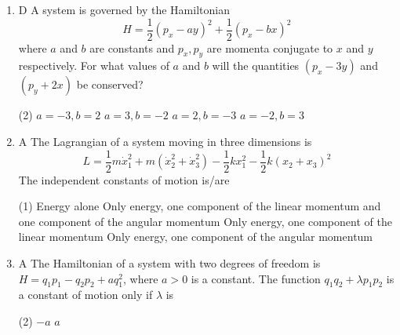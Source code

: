 \begin{enumerate}
{}
 \begin{tasks}(4)
	\task[\textbf{a.}]$\sqrt{2} p-x$
	\task[\textbf{b.}] $p-\sqrt{2} x$
	\task[\textbf{c.}]$p+\sqrt{2} x$
	\task[\textbf{d.}]  $x+\sqrt{2} p$
\end{tasks}
\item D A system is governed by the Hamiltonian
$$
H=\frac{1}{2}\left(p_{x}-a y\right)^{2}+\frac{1}{2}\left(p_{x}-b x\right)^{2}
$$
where $a$ and $b$ are constants and $p_{x}, p_{y}$ are momenta conjugate to $x$ and $y$ respectively.
For what values of $a$ and $b$ will the quantities $\left(p_{x}-3 y\right)$ and $\left(p_{y}+2 x\right)$ be conserved?
{}
 \begin{tasks}(2)
	\task[\textbf{a.}]$a=-3, b=2$
	\task[\textbf{b.}]$a=3, b=-2$
	\task[\textbf{c.}]$a=2, b=-3$
	\task[\textbf{d.}] $a=-2, b=3$
\end{tasks}
\item A The Lagrangian of a system moving in three dimensions is
$$
L=\frac{1}{2} m \dot{x}_{1}^{2}+m\left(\dot{x}_{2}^{2}+\dot{x}_{3}^{2}\right)-\frac{1}{2} k x_{1}^{2}-\frac{1}{2} k\left(x_{2}+x_{3}\right)^{2}
$$
The independent constants of motion is/are
{}
 \begin{tasks}(1)
	\task[\textbf{a.}]Energy alone
	\task[\textbf{b.}] Only energy, one component of the linear momentum and one component of the angular momentum
	\task[\textbf{c.}] Only energy, one component of the linear momentum
	\task[\textbf{d.}] Only energy, one component of the angular momentum
\end{tasks}
\item A The Hamiltonian of a system with two degrees of freedom is $H=q_{1} p_{1}-q_{2} p_{2}+a q_{1}^{2}$, where $a>0$ is a constant. The function $q_{1} q_{2}+\lambda p_{1} p_{2}$ is a constant of motion only if $\lambda$ is
{}
 \begin{tasks}(2)
	\task[\textbf{c.}]$-a$
	\task[\textbf{d.}]$a$ 
\end{tasks}
\end{enumerate}
\setlength\arrayrulewidth{1pt}
